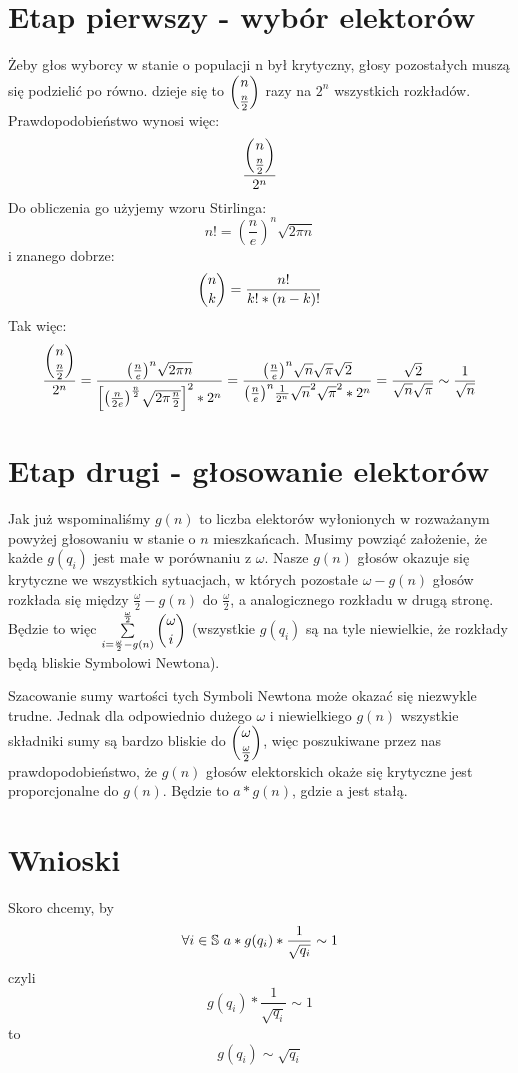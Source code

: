 \documentclass[9pt, letterpaper, notitlepage]{article}
\begin{document}
	\section{Etap pierwszy - wybór elektorów}
		Żeby głos wyborcy w stanie o populacji n był krytyczny, głosy pozostałych muszą się podzielić po równo. dzieje się to $\dbinom{n}{\frac{n}{2}}$ razy na $2^n$ wszystkich rozkładów. Prawdopodobieństwo wynosi więc: \[ \frac{\dbinom{n}{\frac{n}{2}}}{2^n} \]
		Do obliczenia go użyjemy wzoru Stirlinga:
		\begin{equation}
			n! = {\left( \frac{n}{\mathit{e}} \right)}^n \sqrt{2\pi n}
		\end{equation}
		i znanego dobrze:
		\begin{equation}
			\dbinom{n}{k} = \frac{n!}{k! * (n - k)!}
		\end{equation}
		Tak więc:
		\[
		 	\frac{\dbinom{n}{\frac{n}{2}}}{2^n} = \frac{ {\left( \frac{n}{\mathit{e}} \right)}^n \sqrt{2\pi n} }{ {\left[{\left( \frac{n}{2\mathit{e}} \right)}^{\frac{n}{2}} \sqrt{2\pi \frac{n}{2}} \right]}^2 * 2^{n}} = \frac{ {\left( \frac{n}{\mathit{e}} \right)}^n \sqrt{n} \sqrt{\pi} \sqrt{2} }{ {\left( \frac{n}{\mathit{e}} \right)}^n \frac{1}{2^n} \sqrt{n}^2 \sqrt{\pi}^2 * 2^{n}} = \frac{\sqrt{2}}{\sqrt{n} \sqrt{\pi}} \sim \frac{1}{\sqrt{n}}
		\]
	\section{Etap drugi - głosowanie elektorów}
		Jak już wspominaliśmy $g(n)$ to liczba elektorów wyłonionych w rozważanym powyżej głosowaniu w stanie o $n$ mieszkańcach. Musimy powziąć założenie, że każde $g( q_i )$ jest małe w porównaniu z $\omega$.
		Nasze $g( n )$  głosów okazuje się krytyczne we wszystkich sytuacjach, w których pozostałe $\omega - g( n)$ głosów rozkłada się między $\frac{\omega}{2} - g( n )$ do $\frac{\omega}{2}$, a analogicznego rozkładu w drugą stronę. Będzie to więc $\sum\limits_{i = \frac{\omega}{2} - g( n )}^{\frac{\omega}{2}}{\dbinom{\omega}{i}}$ (wszystkie $g( q_i)$ są na tyle niewielkie, że rozkłady będą bliskie Symbolowi Newtona).
		
		
		Szacowanie sumy wartości tych Symboli Newtona może okazać się niezwykle trudne. Jednak dla odpowiednio dużego $\omega$ i niewielkiego $g( n )$ wszystkie składniki sumy są bardzo bliskie do $\dbinom{\omega}{\frac{\omega}{2}}$, więc poszukiwane przez nas prawdopodobieństwo, że $g( n )$ głosów elektorskich okaże się krytyczne jest proporcjonalne do $g(n)$. Będzie to $a * g( n )$, gdzie a jest stałą.
	\section{Wnioski}
		Skoro chcemy, by
		\[
			\forall i \in \mathbb{S} \\\ a * g( q_i ) * \frac{1}{\sqrt{q_i}} \sim 1
		\]
		czyli
		\[
			g( q_i ) * \frac{1}{\sqrt{q_i}} \sim 1
		\]
		to
		\[
			g( q_i ) \sim \sqrt{q_i}
		\]
\end{document}
